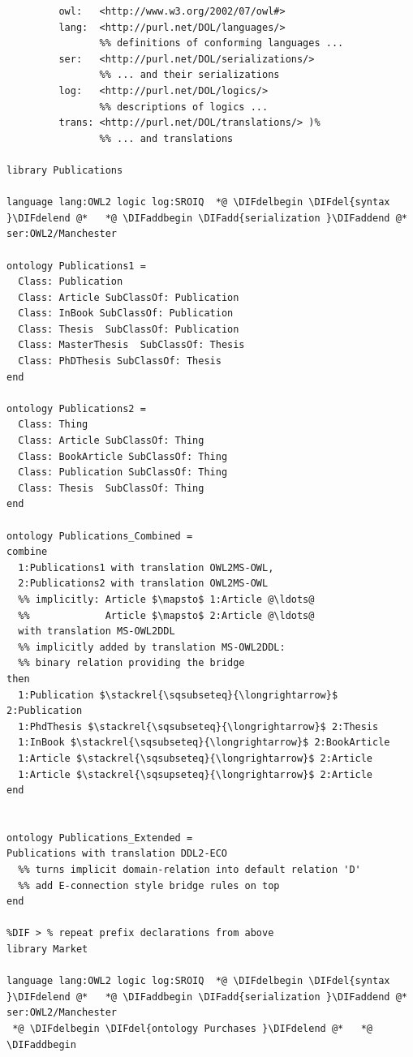\documentclass[10pt,fleqn,final]{scrreprt}
\providecommand{\DIFadd}[1]{{\protect\color{blue}\uwave{#1}}} %
\providecommand{\DIFdel}[1]{{\protect\color{red}\sout{#1}}}                      %
\providecommand{\DIFaddbegin}{} %
\providecommand{\DIFaddend}{} %
\providecommand{\DIFdelbegin}{} %
\providecommand{\DIFdelend}{} %
\begin{document}
\begin{lstlisting}[basicstyle=\ttfamily,language=dolText,alsolanguage=OWL2manchester,escapechar=@,mathescape]
%prefix( :      <http://www.example.org/mereology#>
         owl:   <http://www.w3.org/2002/07/owl#>
         lang:  <http://purl.net/DOL/languages/>
                %% definitions of conforming languages ...
         ser:   <http://purl.net/DOL/serializations/>
                %% ... and their serializations
         log:   <http://purl.net/DOL/logics/>
                %% descriptions of logics ...
         trans: <http://purl.net/DOL/translations/> )%
                %% ... and translations

library Publications

language lang:OWL2 logic log:SROIQ  *@ \DIFdelbegin \DIFdel{syntax }\DIFdelend @*   *@ \DIFaddbegin \DIFadd{serialization }\DIFaddend @*  ser:OWL2/Manchester

ontology Publications1 =
  Class: Publication
  Class: Article SubClassOf: Publication
  Class: InBook SubClassOf: Publication
  Class: Thesis  SubClassOf: Publication
  Class: MasterThesis  SubClassOf: Thesis
  Class: PhDThesis SubClassOf: Thesis
end

ontology Publications2 =
  Class: Thing
  Class: Article SubClassOf: Thing
  Class: BookArticle SubClassOf: Thing
  Class: Publication SubClassOf: Thing
  Class: Thesis  SubClassOf: Thing
end

ontology Publications_Combined =
combine
  1:Publications1 with translation OWL2MS-OWL,
  2:Publications2 with translation OWL2MS-OWL
  %% implicitly: Article $\mapsto$ 1:Article @\ldots@
  %%             Article $\mapsto$ 2:Article @\ldots@  
  with translation MS-OWL2DDL
  %% implicitly added by translation MS-OWL2DDL: 
  %% binary relation providing the bridge
then
  1:Publication $\stackrel{\sqsubseteq}{\longrightarrow}$ 2:Publication
  1:PhdThesis $\stackrel{\sqsubseteq}{\longrightarrow}$ 2:Thesis
  1:InBook $\stackrel{\sqsubseteq}{\longrightarrow}$ 2:BookArticle
  1:Article $\stackrel{\sqsubseteq}{\longrightarrow}$ 2:Article
  1:Article $\stackrel{\sqsupseteq}{\longrightarrow}$ 2:Article
end


ontology Publications_Extended =
Publications with translation DDL2-ECO
  %% turns implicit domain-relation into default relation 'D'
  %% add E-connection style bridge rules on top
end

%DIF > % repeat prefix declarations from above
library Market

language lang:OWL2 logic log:SROIQ  *@ \DIFdelbegin \DIFdel{syntax }\DIFdelend @*   *@ \DIFaddbegin \DIFadd{serialization }\DIFaddend @*  ser:OWL2/Manchester
 *@ \DIFdelbegin \DIFdel{ontology Purchases }\DIFdelend @*   *@ \DIFaddbegin 


\end{lstlisting}
\end{document}
